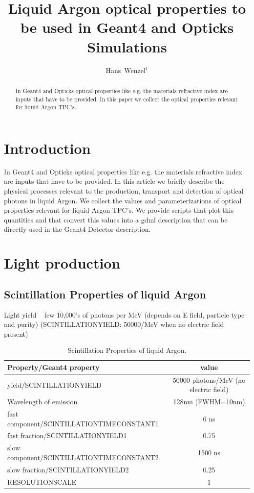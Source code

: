 \documentclass[a4paper]{jpconf}
\begin{document}
\title{Liquid Argon optical properties to be used in Geant4 and Opticks Simulations}

\author{ Hans~Wenzel$^1$}

\address{ $^1$~Fermilab PO Box 500, Batavia, IL 60510,
USA}


\begin{abstract}
  In Geant4 and Opticks optical properties like e.g. the materials refractive
  index are inputs that have to be provided. In this paper we collect the
  optical properties relevant for liquid Argon TPC's.   
\end{abstract}

\section{Introduction}
  In Geant4 and Opticks optical properties like e.g. the materials refractive
  index are inputs that have to be provided. In this article we briefly describe the physical processes relevant to the
  production, transport and detection of optical photons in liquid Argon. We collect the
  values and parameterizations of optical properties relevant for liquid Argon TPC's. We provide scripts that plot this quantities and that convert this values
  into a gdml description that can be directly used in the Geant4 Detector description.
  \section{Light production}  
  \subsection{Scintillation Properties of liquid Argon}
  Light yield ~ few 10,000’s of photons per MeV (depends on E field, particle type and purity)
(SCINTILLATIONYIELD: 50000/MeV when no electric field present)
  \begin{table}[h!]
  \begin{center}
    \label{tab:table1}
    \begin{tabular}{|l|c|} %
      \hline
      \textbf{Property/Geant4 property} &       \textbf{value}\\
      \hline
      yield/SCINTILLATIONYIELD & 50000 photons/MeV (no electric field)\\
      Wavelength of emission &  128nm (FWHM=10nm)\\
      fast component/SCINTILLATIONTIMECONSTANT1& 6 ns\\  
      fast fraction/SCINTILLATIONYIELD1& 0.75 \\
      slow component/SCINTILLATIONTIMECONSTANT2& 1500 ns \\
      slow fraction/SCINTILLATIONYIELD2& 0.25\\
      RESOLUTIONSCALE& 1\\
      \hline
    \end{tabular}
  \end{center}
  \caption{Scintillation Properties of liquid Argon.}
  \end{table}
\end{document}
